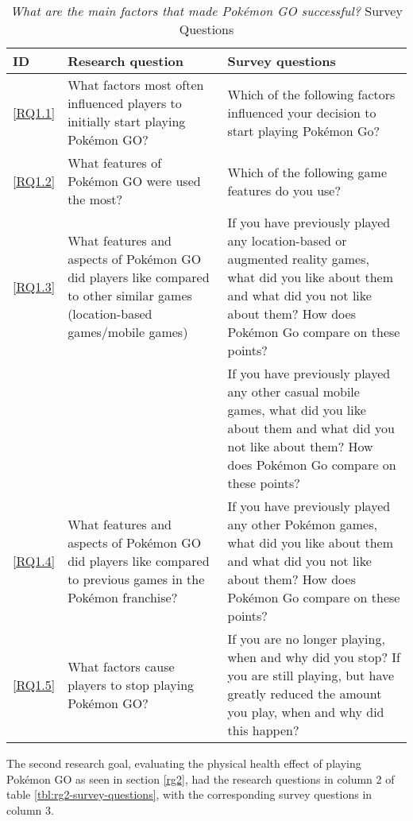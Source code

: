 \begin{table}[h!]
	\caption{\emph{What are the main factors that made Pokémon GO successful?} Survey Questions}
	\centering
	\label{tbl:rg1-survey-questions}
	\begin{tabularx}{\textwidth}{|l|X|X|}
		\hline
		\textbf{ID} & \textbf{Research question} & \textbf{Survey questions}\\
		\hline\hline
		
		\ref{RQ1.1} & What factors most often influenced players to initially start playing Pokémon GO? & Which of the following factors influenced your decision to start playing Pokémon Go?\\
		\hline
		
		\ref{RQ1.2} & What features of Pokémon GO were used the most? & Which of the following game features do you use?\\
		\hline
		
		\ref{RQ1.3} & What features and aspects of Pokémon GO did players like compared to other similar games (location-based games/mobile games) & If you have previously played any location-based or augmented reality games, what did you like about them and what did you not like about them? How does Pokémon Go compare on these points?\\
		\cline{3-3}
		
		 & & If you have previously played any other casual mobile games, what did you like about them and what did you not like about them? How does Pokémon Go compare on these points?\\
		\hline
		
		\ref{RQ1.4} & What features and aspects of Pokémon GO did players like compared to previous games in the Pokémon franchise? & If you have previously played any other Pokémon games, what did you like about them and what did you not like about them? How does Pokémon Go compare on these points?\\
		\hline
		
		\ref{RQ1.5} & What factors cause players to stop playing Pokémon GO? & If you are no longer playing, when and why did you stop? If you are still playing, but have greatly reduced the amount you play, when and why did this happen?\\
		\hline
	\end{tabularx}
\end{table}

The second research goal, evaluating the physical health effect of playing Pokémon GO as seen in section \ref{rg2}, had the research questions in column 2 of table \ref{tbl:rg2-survey-questions}, with the corresponding survey questions in column 3.

